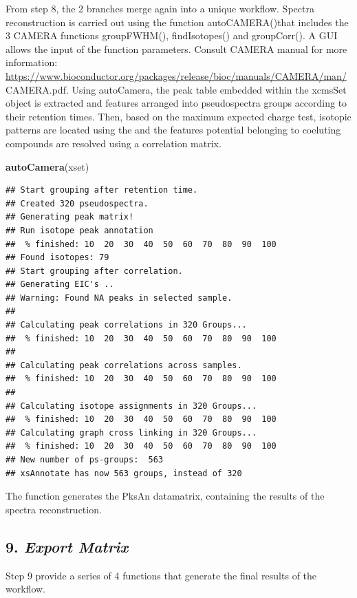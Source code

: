 \documentclass[
]{article}
\newenvironment{Shaded}{\begin{snugshade}}{\end{snugshade}}
\newcommand{\KeywordTok}[1]{\textcolor[rgb]{0.13,0.29,0.53}{\textbf{#1}}}
\newcommand{\NormalTok}[1]{#1}
\begin{document}
From step 8, the 2 branches merge again into a unique workflow. Spectra
reconstruction is carried out using the function autoCAMERA()that
includes the 3 CAMERA functions groupFWHM(), findIsotopes() and
groupCorr(). A GUI allows the input of the function parameters. Consult
CAMERA manual for more information:
\url{https://www.bioconductor.org/packages/release/bioc/manuals/CAMERA/man/}
CAMERA.pdf. Using autoCamera, the peak table embedded within the xcmsSet
object is extracted and features arranged into pseudospectra groups
according to their retention times. Then, based on the maximum expected
charge test, isotopic patterns are located using the and the features
potential belonging to coeluting compounds are resolved using a
correlation matrix.

\begin{Shaded}
\begin{Highlighting}[]
\KeywordTok{autoCamera}\NormalTok{(xset)}
\end{Highlighting}
\end{Shaded}

\begin{verbatim}
## Start grouping after retention time.
## Created 320 pseudospectra.
## Generating peak matrix!
## Run isotope peak annotation
##  % finished: 10  20  30  40  50  60  70  80  90  100  
## Found isotopes: 79 
## Start grouping after correlation.
## Generating EIC's .. 
## Warning: Found NA peaks in selected sample.
## 
## Calculating peak correlations in 320 Groups... 
##  % finished: 10  20  30  40  50  60  70  80  90  100  
## 
## Calculating peak correlations across samples.
##  % finished: 10  20  30  40  50  60  70  80  90  100  
## 
## Calculating isotope assignments in 320 Groups... 
##  % finished: 10  20  30  40  50  60  70  80  90  100  
## Calculating graph cross linking in 320 Groups... 
##  % finished: 10  20  30  40  50  60  70  80  90  100  
## New number of ps-groups:  563 
## xsAnnotate has now 563 groups, instead of 320
\end{verbatim}

The function generates the PksAn datamatrix, containing the results of
the spectra reconstruction.

\hypertarget{export-matrix}{%
\subsection{\texorpdfstring{9. \emph{Export
Matrix}}{9. Export Matrix}}\label{export-matrix}}

Step 9 provide a series of 4 functions that generate the final results
of the workflow.
\end{document}
